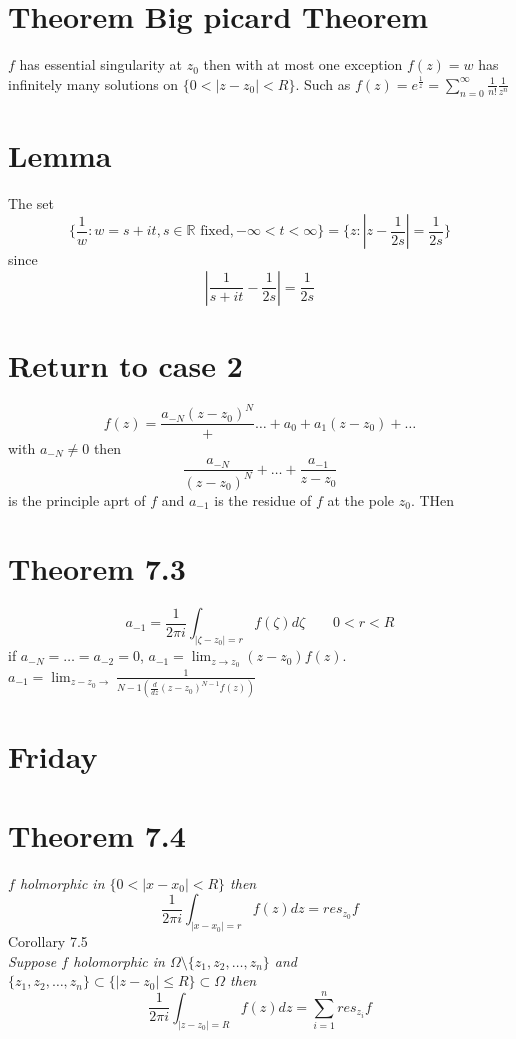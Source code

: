 \documentclass[11pt]{article}
\begin{document}
\section{Theorem Big picard Theorem}
$f$ has essential singularity at $z_0$  then with at most one exception $f(z) = w$ has infinitely many solutions on  $\{0 < |z-z_0| < R\}$.
Such as $f(z) = e^{\frac{1}{z}} = \sum_{n=0}^{\infty} \frac{1}{n!}\frac{1}{z^{n}}$

\section{Lemma}
The set
\[
    \{\frac{1}{w} : w = s + it, s \in \mathbb{R} \text{ fixed}, -\infty < t < \infty\} = \{z : |z-\frac{1}{2s}| = \frac{1}{2s}\}
\] 
since
\[
|\frac{1}{s+it} - \frac{1}{2s}| = \frac{1}{2s}
\] 

\section{Return to case 2}
\[
    f(z) = \frac{a_{-N}{(z-z_0)^{N}}} + \dots + a_0 + a_1(z-z_0) + \dots
\] 
with $a_{-N} \ne 0$ 
then
\[
    \frac{a_{-N}}{(z-z_0)^{N}} + \dots + \frac{a_{-1}}{z-z_0}
\] 
is the principle aprt of $f$ and $a_{-1}$ is the residue of  $f$ at the pole $z_0$.
THen
\section{Theorem 7.3}
\[
    a_{-1} = \frac{1}{2\pi i} \int_{|\zeta - z_0| = r}^{}f(\zeta) d \zeta \qquad 0 < r < R
\] 
if $a_{-N} = \dots = a_{-2} = 0$,  $a_{-1} = \lim_{z \to z_0}(z-z_0)f(z)$. $a_{-1} = \lim_{z-z_0\to } \frac{1}{N-1( \frac{d}{dz} (z-z_0)^{N-1}f(z))}$

\section{Friday}
\section{Theorem 7.4}
\emph{
    $f$ holmorphic in $\{0 < |x-x_0| < R\}$ then
    \[
        \frac{1}{2\pi i} \int_{|x-x_0| = r}^{}f(z) dz = res_{z_0}f
    \]
}
Corollary 7.5\\
\emph{
    Suppose $f$ holomorphic in $\Omega \setminus \{z_1,z_2,\dots,z_n\}$ and $\{z_1,z_2,\dots,z_n\} \subset \{|z-z_0| \le R\} \subset \Omega$
    then
    \[
        \frac{1}{2\pi i} \int_{|z-z_0| = R}^{}f(z)dz = \sum_{i=1}^{n}res_{z_i}f
    \]
}
\end{document}
